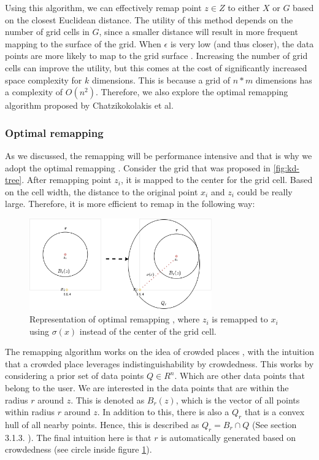 Using this algorithm, we can effectively remap point $z \in Z$ to either $X$ or $G$ based on the closest Euclidean distance.
The utility of this method depends on the number of grid cells in $G$, since a smaller distance will result in more frequent mapping to the surface of the grid.
When $\epsilon$ is very low (and thus closer), the data points are more likely to map to the grid surface .
Increasing the number of grid cells can improve the utility, but this comes at the cost of significantly increased space complexity for $k$ dimensions.
This is because a grid of $n*m$ dimensions has a complexity of $O(n^2)$.
Therefore, we also explore the optimal remapping algorithm proposed by Chatzikokolakis et al.

\subsubsection{Optimal remapping}
As we discussed, the remapping will be performance intensive and that is why we adopt the optimal remapping \citep{chatzikokolakis_practical_nodate}.
Consider the grid that was proposed in \ref{fig:kd-tree}.
After remapping point $z_i$, it is mapped to the center for the grid cell.
Based on the cell width, the distance to the original point $x_i$ and $ z_i$ could be really large.
Therefore, it is more efficient to remap in the following way:
\begin{figure}[H]
  \includegraphics[width=0.7\textwidth]{TheorethicalFramework/ND-Laplace/Images/optimal-remapping.png}
  \caption{Representation of optimal remapping \citep{chatzikokolakis_practical_nodate}, where $z_i$ is remapped to $x_i$ using $\sigma(x)$ instead of the center of the grid cell.}
  \label{fig:optimal-remapping}
\end{figure}
The remapping algorithm works on the idea of crowded places , with the intuition that a crowded place leverages indistinguishability by crowdedness.
This works by considering a prior set of data points $Q \in R^n$.
Which are other data points that belong to the user.
We are interested in the data points that are within the radius $r$ around $z$.
This is denoted as $B_r(z)$, which is the vector of all points within radius $r$ around $z$.
In addition to this, there is also a $Q_r$ that is a convex hull of all nearby points.
Hence, this is described as $Q_r = B_r \cap Q$ (See section 3.1.3. ).
The final intuition here is that $r$ is automatically generated based on crowdedness (see circle inside figure \ref{fig:optimal-remapping}).

